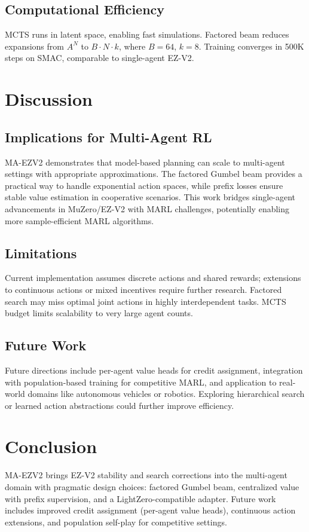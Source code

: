 \documentclass[10pt]{article}
\begin{document}
\subsection{Computational Efficiency}
MCTS runs in latent space, enabling fast simulations. Factored beam reduces expansions from $A^N$ to $B \cdot N \cdot k$, where $B=64$, $k=8$. Training converges in 500K steps on SMAC, comparable to single-agent EZ-V2.

\section{Discussion}
\subsection{Implications for Multi-Agent RL}
MA-EZV2 demonstrates that model-based planning can scale to multi-agent settings with appropriate approximations. The factored Gumbel beam provides a practical way to handle exponential action spaces, while prefix losses ensure stable value estimation in cooperative scenarios. This work bridges single-agent advancements in MuZero/EZ-V2 with MARL challenges, potentially enabling more sample-efficient MARL algorithms.

\subsection{Limitations}
Current implementation assumes discrete actions and shared rewards; extensions to continuous actions or mixed incentives require further research. Factored search may miss optimal joint actions in highly interdependent tasks. MCTS budget limits scalability to very large agent counts.

\subsection{Future Work}
Future directions include per-agent value heads for credit assignment, integration with population-based training for competitive MARL, and application to real-world domains like autonomous vehicles or robotics. Exploring hierarchical search or learned action abstractions could further improve efficiency.

\section{Conclusion}
MA-EZV2 brings EZ-V2 stability and search corrections into the multi-agent domain with pragmatic design choices: factored Gumbel beam, centralized value with prefix supervision, and a LightZero-compatible adapter. Future work includes improved credit assignment (per-agent value heads), continuous action extensions, and population self-play for competitive settings.
\end{document}
